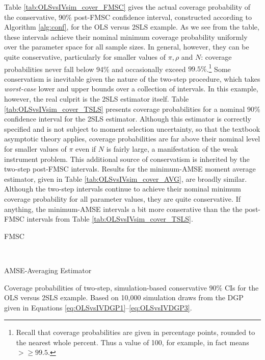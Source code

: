 Table \ref{tab:OLSvsIVsim_cover_FMSC} gives the actual coverage probability of the conservative, 90\% post-FMSC confidence interval, constructed according to Algorithm \ref{alg:conf}, for the OLS versus 2SLS example.
As we see from the table, these intervals achieve their nominal minimum coverage probability uniformly over the parameter space for all sample sizes.
In general, however, they can be quite conservative, particularly for smaller values of $\pi, \rho$ and $N$: coverage probabilities never fall below 94\% and occasionally exceed $99.5\%$.\footnote{Recall that coverage probabilities are given in percentage points, rounded to the nearest whole percent. Thus a value of 100, for example, in fact means $>\geq 99.5$.}
Some conservatism is inevitable given the nature of the two-step procedure, which takes \emph{worst-case} lower and upper bounds over a collection of intervals.
In this example, however, the real culprit is the 2SLS estimator itself.
Table \ref{tab:OLSvsIVsim_cover_TSLS} presents coverage probabilities for a nominal 90\% confidence interval for the 2SLS estimator.
Although this estimator is correctly specified and is not subject to moment selection uncertainty, so that the textbook asymptotic theory applies, coverage probabilities are far above their nominal level for smaller values of $\pi$ even if $N$ is fairly large, a manifestation of the weak instrument problem.
This additional source of conservatism is inherited by the two-step post-FMSC intervals.
Results for the minimum-AMSE moment average estimator, given in Table \ref{tab:OLSvsIVsim_cover_AVG}, are broadly similar.
Although the two-step intervals continue to achieve their nominal minimum coverage probability for all parameter values, they are quite conservative.
If anything, the minimum-AMSE intervals a bit more conserative than the the post-FMSC intervals from Table \ref{tab:OLSvsIVsim_cover_TSLS}.

\begin{table}[h]
\footnotesize
\centering
	\begin{subtable}{0.48\textwidth}
		\caption{FMSC}
		
		\label{tab:OLSvsIVsim_cover_FMSC}
	\end{subtable}	
	~
	\begin{subtable}{0.48\textwidth}
		\caption{AMSE-Averaging Estimator}
		
		\label{tab:OLSvsIVsim_cover_AVG}
	\end{subtable}
	\caption{Coverage probabilities of two-step, simulation-based conservative $90\%$ CIs for the OLS versus 2SLS example. Based on 10,000 simulation draws from the DGP given in Equations \ref{eq:OLSvsIVDGP1}--\ref{eq:OLSvsIVDGP3}.}
\end{table}

